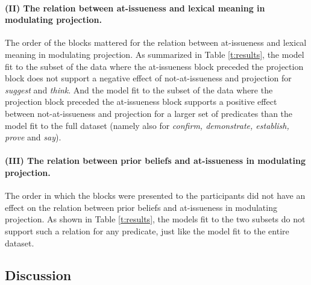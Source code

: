 \documentclass[11pt,fleqn]{article}
\newcommand{\6}{\mbox{$[\hspace*{-.6mm}[$}}
\newcommand{\9}{\mbox{$]\hspace*{-.6mm}]$}}
\begin{document}
\paragraph{(II) The relation between at-issueness and lexical meaning in modulating projection.} The order of the blocks mattered for the relation between at-issueness and lexical meaning in modulating projection. As summarized in Table \ref{t:results}, the model fit to the subset of the data where the at-issueness block preceded the projection block does not support a negative effect of not-at-issueness and projection for {\em suggest} and {\em think}. And the model fit to the subset of the data where the projection block preceded the at-issueness block supports a positive effect between not-at-issueness and projection for a larger set of predicates than the model fit to the full dataset (namely also for {\em confirm, demonstrate, establish, prove} and {\em say}). 

\paragraph{(III) The relation between prior beliefs and at-issueness in modulating projection.} The order in which the blocks were presented to the participants did not have an effect on the relation between prior beliefs and at-issueness in modulating projection. As shown in Table \ref{t:results}, the models fit to the two subsets do not support such a relation for any predicate, just like the model fit to the entire dataset.

\subsection{Discussion}\label{s:discussion-exp1}
\end{document}

